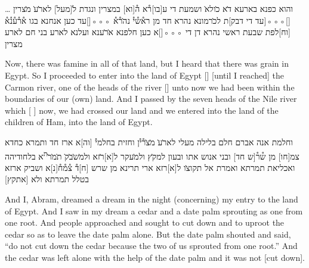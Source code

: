 
\begin{aramaictext}
    \dots
    \vacat
    והוא כפנא בארעא ד̇א כ̇ולא̇ ושמעת די ע[בו]ר֯א 
    ה֯[וא] במצרין ונגדת
    ל̇[מעל] לאר̇̇ע̇ מ̇צרין [\hspace*{1.5em}]◦◦◦[\hspace*{1.5em}עד די דבק]ת לכ̇רמונא נהרא חד מן 
    רא֯ש֯י֯ נה̇ר֯א֯ ◦◦◦[\hspace*{1.5em}]עד כען אנחנא בגו א֯ר֯ע֯נ֯א֯ [וח]לפת שבעת ראשי נהרא דן 
    די
    ◦◦◦[\hspace*{1.5em}]א כען חלפנא א̇ר̇ענא ועלנא לארע בני חם לארע מצרין
\end{aramaictext}

\begin{translation}
    Now, there was famine in all of that land, but I heard that there was grain in Egypt. So I proceeded 
    to enter into the land of Egypt [\hspace*{1em}] [until I reached] the Carmon river, one of 
    the heads of the river [\hspace*{1em}] unto now we had been within the boundaries of our (own) land. And I passed by the seven heads of the Nile river which [
    ] now, we had crossed our land and we entered into the land of the children of Ham, into the land of Egypt.
\end{translation}

\begin{aramaictext}
    \vacat
    וחלמת אנה אברם חלם בלילה מעלי לאר̇ע̇ מ̇צ̇ר֯י֯ן וחזית בחלמי֯ [וה]א 
    ארז חד ותמרא
    כחדא צמ[חו] מן ש֯ר֯[ש חד] ובני אנוש אתו ובעון למק̇ץ ולמ̇עקר ל[א]ר̇זא 
    ולמ̇ש̇ב̇ק̇ ת̇מ̇ר̇\textsuperscript{ת}א בלחודיהה
    ואכליאת תמרתא ואמרת אל תקוצ̇ו ל[א]רזא ארי תרינא מן שרש [ח]ד֯ 
    צ֯מ֯ח֯[נ]א ושביק ארזא בטלל תמרתא
    ולא [אתקץ] \vacat
\end{aramaictext}

\begin{translation}
    And I, Abram, dreamed a dream in the night (concerning) my entry to the land of Egypt.  And I saw in my dream a cedar and a date palm
    sprouting as one from one root. And people approached and sought to cut down and to uproot the cedar so as to leave the date palm alone.
    But the date palm shouted and said, ``do not cut down the cedar because the two of us sprouted from one root.'' And the cedar was left alone with the help of the date palm
    and it was not [cut down].
\end{translation}

